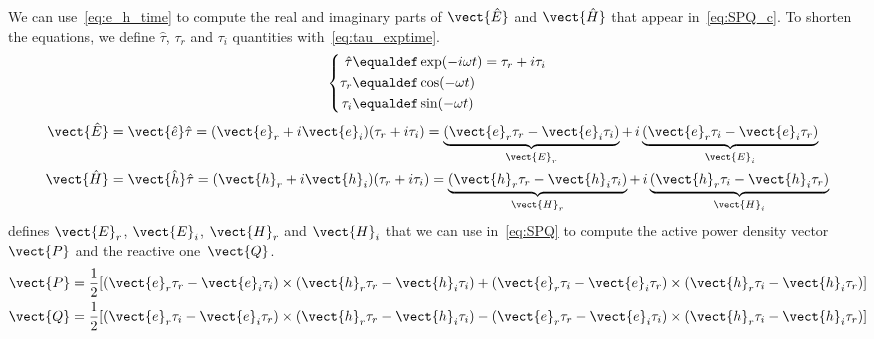 We can use~\cref{eq:e_h_time} to compute the real and imaginary parts of $\vect{\hat{E}}$ and $\vect{\hat{H}}$ that appear in~\cref{eq:SPQ_c}.
To shorten the equations, we define $\hat{\tau}$, $\tau_r$ and $\tau_i$ quantities with~\cref{eq:tau_exptime}.
\begin{equation}
    \left\lbrace
        \begin{aligned}        
            \hat{\tau} &\equaldef \exp(-i \omega t) = \tau_r + i \tau_i\\
            \tau_r     &\equaldef \cos(-\omega t)\\
            \tau_i     &\equaldef \sin(-\omega t)
        \end{aligned}
    \right.
    \label{eq:tau_exptime}
\end{equation}
\begin{subequations}
    \begin{align}
        \vect{\hat{E}}
        &= \vect{\hat{e}} \hat{\tau}
        = (\vect{e}_r + i \vect{e}_i) (\tau_r + i \tau_i)
        =   \underbrace{(\vect{e}_r \tau_r - \vect{e}_i \tau_i)}_{\vect{E}_r}
        +\,i\underbrace{(\vect{e}_r \tau_i - \vect{e}_i \tau_r)}_{\vect{E}_i}
        \\
        \vect{\hat{H}}
        &= \vect{\hat{h}} \hat{\tau}
        = (\vect{h}_r + i \vect{h}_i) (\tau_r + i \tau_i)
        =   \underbrace{(\vect{h}_r \tau_r - \vect{h}_i \tau_i)}_{\vect{H}_r}
        +\,i\underbrace{(\vect{h}_r \tau_i - \vect{h}_i \tau_r)}_{\vect{H}_i}
    \end{align}
    \label{eq:ErEiHrHi}
\end{subequations}
 defines $\vect{E}_r$, $\vect{E}_i$, $\vect{H}_r$ and $\vect{H}_i$ that we can use in~\cref{eq:SPQ} to compute the active power density vector~$\vect{P}$ and the reactive one~$\vect{Q}$.
\begin{subequations}
    \begin{align}    
        \vect{P}
        &=
        \frac{1}{2}
        [
        (\vect{e}_r \tau_r - \vect{e}_i \tau_i) \times
        (\vect{h}_r \tau_r - \vect{h}_i \tau_i)
        +
        (\vect{e}_r \tau_i - \vect{e}_i \tau_r) \times
        (\vect{h}_r \tau_i - \vect{h}_i \tau_r)
        ]
        \\
        \vect{Q}
        &=
        \frac{1}{2}
        [
        (\vect{e}_r \tau_i - \vect{e}_i \tau_r) \times
        (\vect{h}_r \tau_r - \vect{h}_i \tau_i)
        -
        (\vect{e}_r \tau_r - \vect{e}_i \tau_i) \times
        (\vect{h}_r \tau_i - \vect{h}_i \tau_r)
        ]
    \end{align}
    \label{eq:PQ}
\end{subequations}
